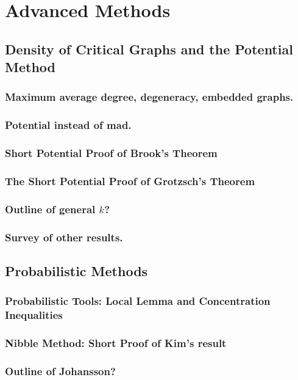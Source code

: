 \documentclass[12pt,twoside,openright,a4paper]{book}
\begin{document}
\part{Advanced Methods}

\chapter{Density of Critical Graphs and the Potential Method}\label{chap:potential}


\section{Maximum average degree, degeneracy, embedded graphs.}
\section{Potential instead of mad.}
\section{Short Potential Proof of Brook's Theorem}
\section{The Short Potential Proof of Grotzsch's Theorem}
\section{Outline of general $k$?}
\section{Survey of other results.}

\chapter{Probabilistic Methods}
\section{Probabilistic Tools: Local Lemma and Concentration Inequalities}
\section{Nibble Method: Short Proof of Kim's result}
\section{Outline of Johansson?}
\end{document}
